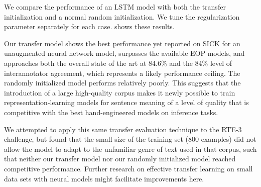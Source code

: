 We compare the performance of an LSTM model with both the transfer initialization and a normal random initialization. We tune the regularization parameter separately for each case.  shows these results. 

Our transfer model shows the best performance yet reported on SICK for an unaugmented neural network model, surpasses the available EOP models, and approaches both the overall state of the art at 84.6\% \cite{lai2014illinois} and the 84\% level of interannotator agreement, which represents a likely performance ceiling. The randomly initialized model performs relatively poorly. This suggests that the introduction of a large high-quality corpus makes it newly possible to train representation-learning models for sentence meaning of a level of quality that is competitive with the best hand-engineered models on inference tasks.

We attempted to apply this same transfer evaluation technique to the RTE-3 challenge, but found that the small size of the training set (800 examples) did not allow the model to adapt to the unfamiliar genre of text used in that corpus, such that neither our transfer model nor our randomly initialized model reached competitive performance.
Further research on effective transfer learning on small data sets with neural models might facilitate improvements here.



